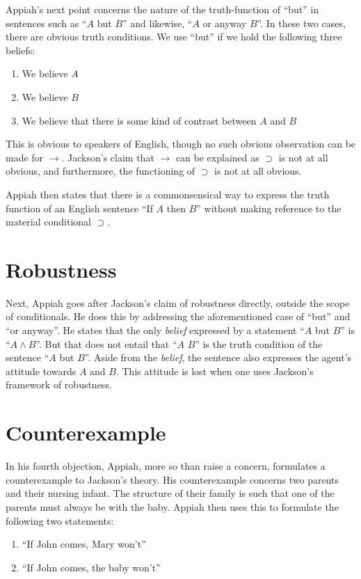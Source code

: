 \documentclass[12pt]{article}
\begin{document}
Appiah's next point concerns the nature of the truth-function of ``but'' in
sentences such as ``$A$ but $B$'' and likewise, ``$A$ or anyway $B$''. In these
two cases, there are obvious truth conditions. We use ``but'' if we hold the
following three beliefs:
\begin{enumerate}
	\item
		We believe $A$
	\item
		We believe $B$
	\item
		We believe that there is some kind of contrast between $A$ and
		$B$
\end{enumerate}
This is obvious to speakers of English, though no such obvious observation can
be made for $\rightarrow$. Jackson's claim that $\rightarrow$ can be explained
as $\supset$ is not at all obvious, and furthermore, the functioning of
$\supset$ is not at all obvious.

Appiah then states that there is a commonsensical way to express the truth
function of an English sentence ``If $A$ then $B$'' without making reference to
the material conditional $\supset$.

\section{Robustness}

Next, Appiah goes after Jackson's claim of robustness directly, outside the
scope of conditionals. He does this by addressing the aforementioned case of
``but'' and ``or anyway''. He states that the only \emph{belief} expressed by a
statement ``$A$ but $B$'' is ``$A \land B$''. But that does not entail that
``$A$ \land $B$'' is the truth condition of the sentence ``$A$ but $B$''. Aside
from the \emph{belief}, the sentence also expresses the agent's attitude towards
$A$ and $B$.  This attitude is lost when one uses Jackson's framework of
robustness.

\section{Counterexample}

In his fourth objection, Appiah, more so than raise a concern, formulates a
counterexample to Jackson's theory. His counterexample concerns two parents and
their nursing infant. The structure of their family is such that one of the
parents must always be with the baby. Appiah then uses this to formulate the
following two statements:

\begin{enumerate}
	\item
		``If John comes, Mary won't''
	\item
		``If John comes, the baby won't''
\end{enumerate}
\end{document}

